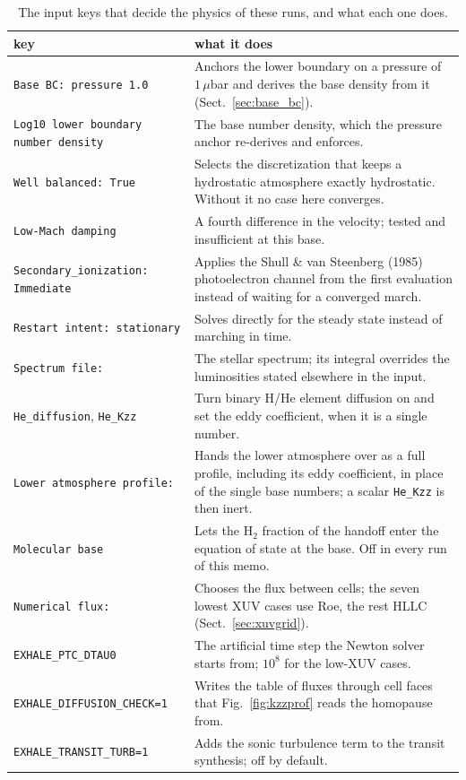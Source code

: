 \documentclass[english,a4paper]{my_memo}
\begin{document}
\begin{table}[htbp]\centering\small
\caption{The input keys that decide the physics of these runs, and what each
one does.}
\begin{tabular}{lp{}}
\toprule
key & what it does \\
\midrule
\texttt{Base BC: pressure 1.0} & Anchors the lower boundary on a pressure of
$1\,\mu$bar and derives the base density from it (Sect.~\ref{sec:base_bc}). \\
\texttt{Log10 lower boundary number density} & The base number density, which
the pressure anchor re-derives and enforces. \\
\texttt{Well balanced: True} & Selects the discretization that keeps a
hydrostatic atmosphere exactly hydrostatic. Without it no case here
converges. \\
\texttt{Low-Mach damping} & A fourth difference in the velocity; tested and
insufficient at this base. \\
\texttt{Secondary\_ionization: Immediate} & Applies the Shull \& van
Steenberg (1985) photoelectron channel from the first evaluation instead of
waiting for a converged march. \\
\texttt{Restart intent: stationary} & Solves directly for the steady state
instead of marching in time. \\
\texttt{Spectrum file:} & The stellar spectrum; its integral overrides the
luminosities stated elsewhere in the input. \\
\texttt{He\_diffusion}, \texttt{He\_Kzz} & Turn binary H/He element diffusion
on and set the eddy coefficient, when it is a single number. \\
\texttt{Lower atmosphere profile:} & Hands the lower atmosphere over as a
full profile, including its eddy coefficient, in place of the single base
numbers; a scalar \texttt{He\_Kzz} is then inert. \\
\texttt{Molecular base} & Lets the H$_2$ fraction of the handoff enter the
equation of state at the base. Off in every run of this memo. \\
\texttt{Numerical flux:} & Chooses the flux between cells; the seven lowest
XUV cases use Roe, the rest HLLC (Sect.~\ref{sec:xuvgrid}). \\
\texttt{EXHALE\_PTC\_DTAU0} & The artificial time step the Newton solver
starts from; $10^{8}$ for the low-XUV cases. \\
\texttt{EXHALE\_DIFFUSION\_CHECK=1} & Writes the table of fluxes through cell
faces that Fig.~\ref{fig:kzzprof} reads the homopause from. \\
\texttt{EXHALE\_TRANSIT\_TURB=1} & Adds the sonic turbulence term to the
transit synthesis; off by default. \\
\bottomrule
\end{tabular}
\end{table}
\end{document}
